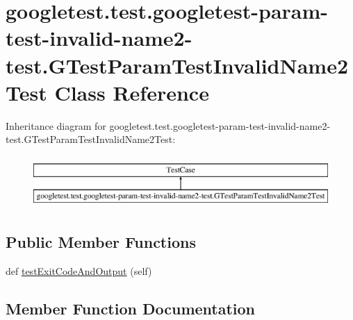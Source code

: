 \hypertarget{classgoogletest_1_1test_1_1googletest-param-test-invalid-name2-test_1_1_g_test_param_test_invalid_name2_test}{}\section{googletest.\+test.\+googletest-\/param-\/test-\/invalid-\/name2-\/test.G\+Test\+Param\+Test\+Invalid\+Name2\+Test Class Reference}
\label{classgoogletest_1_1test_1_1googletest-param-test-invalid-name2-test_1_1_g_test_param_test_invalid_name2_test}
Inheritance diagram for googletest.\+test.\+googletest-\/param-\/test-\/invalid-\/name2-\/test.G\+Test\+Param\+Test\+Invalid\+Name2\+Test\+:\begin{figure}[H]
\begin{center}
\leavevmode
\includegraphics[height=2.000000cm]{d5/d14/classgoogletest_1_1test_1_1googletest-param-test-invalid-name2-test_1_1_g_test_param_test_invalid_name2_test}
\end{center}
\end{figure}
\subsection*{Public Member Functions}
\begin{DoxyCompactItemize}
\item 
def \mbox{\hyperlink{classgoogletest_1_1test_1_1googletest-param-test-invalid-name2-test_1_1_g_test_param_test_invalid_name2_test_aaec289a7215be261e91cfc64a3269ef2}{test\+Exit\+Code\+And\+Output}} (self)
\end{DoxyCompactItemize}


\subsection{Member Function Documentation}
\mbox{\label{classgoogletest_1_1test_1_1googletest-param-test-invalid-name2-test_1_1_g_test_param_test_invalid_name2_test_aaec289a7215be261e91cfc64a3269ef2}} 

